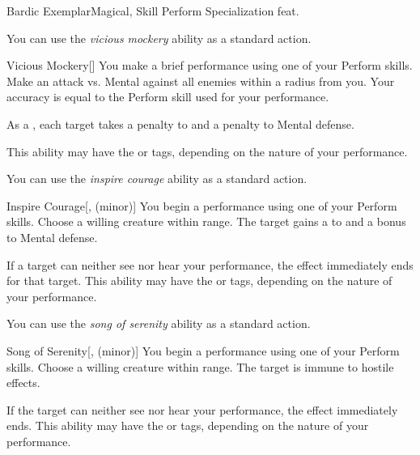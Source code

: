     \begin{feat}{Bardic Exemplar}{Magical, Skill}
        \featpre Perform Specialization feat.

         You can use the \textit{vicious mockery} ability as a standard action.
        \begin{apability}{Vicious Mockery}[]
            You make a brief performance using one of your Perform skills.
            Make an attack vs. Mental against all enemies within a \areahuge radius from you.
            Your accuracy is equal to the Perform skill used for your performance.

            \hit As a , each target takes a  penalty to  and a  penalty to Mental defense.

            This ability may have the  or  tags, depending on the nature of your performance.
        \end{apability}

         You can use the \textit{inspire courage} ability as a standard action.
        \begin{apability}{Inspire Courage}[,  (minor)]
            You begin a performance using one of your Perform skills.
            Choose a willing creature within \rngmed range.
            The target gains a   to  and a  bonus to Mental defense.

            If a target can neither see nor hear your performance, the effect immediately ends for that target.
            This ability may have the  or  tags, depending on the nature of your performance.
        \end{apability}

         You can use the \textit{song of serenity} ability as a standard action.
        \begin{apability}{Song of Serenity}[,  (minor)]
            You begin a performance using one of your Perform skills.
            Choose a willing creature within \rngmed range.
            The target is immune to hostile  effects.

            If the target can neither see nor hear your performance, the effect immediately ends.
            This ability may have the  or  tags, depending on the nature of your performance.
        \end{apability}


\end{feat}
